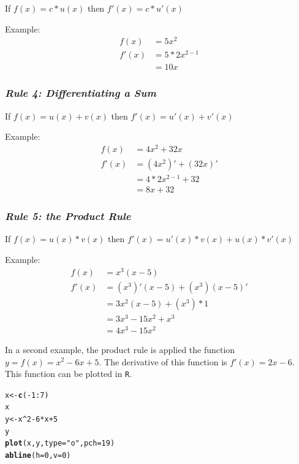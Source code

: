\documentclass[11pt,openany]{book}\usepackage[]{graphicx}\usepackage[]{color}
\makeatletter
\newcommand{\hlnum}[1]{\textcolor[rgb]{0.686,0.059,0.569}{#1}}%
\newcommand{\hlstr}[1]{\textcolor[rgb]{0.192,0.494,0.8}{#1}}%
\newcommand{\hlopt}[1]{\textcolor[rgb]{0,0,0}{#1}}%
\newcommand{\hlstd}[1]{\textcolor[rgb]{0.345,0.345,0.345}{#1}}%
\newcommand{\hlkwb}[1]{\textcolor[rgb]{0.69,0.353,0.396}{#1}}%
\newcommand{\hlkwc}[1]{\textcolor[rgb]{0.333,0.667,0.333}{#1}}%
\newcommand{\hlkwd}[1]{\textcolor[rgb]{0.737,0.353,0.396}{\textbf{#1}}}%
\newenvironment{kframe}{%
 \def\at@end@of@kframe{}%
 \ifinner\ifhmode%
  \def\at@end@of@kframe{\end{minipage}}%
  \begin{minipage}{\columnwidth}%
 \fi\fi%
 \def\FrameCommand##1{\hskip\@totalleftmargin \hskip-\fboxsep
 \colorbox{shadecolor}{##1}\hskip-\fboxsep
     \hskip-\linewidth \hskip-\@totalleftmargin \hskip\columnwidth}%
 \MakeFramed {\advance\hsize-\width
   \@totalleftmargin\z@ \linewidth\hsize
   \@setminipage}}%
 {\par\unskip\endMakeFramed%
 \at@end@of@kframe}
\newenvironment{knitrout}{}{} %
\renewenvironment{knitrout}{\begin{singlespace}}{\end{singlespace}}
\makeatother
\begin{document}
  \begin{center}
    If $f(x)=c*u(x)$ then $f'(x)=c*u'(x)$
  \end{center}
\noindent Example:
\begin{align*}
f(x) &= 5x^{2} \\ 
f'(x)&=5*2x^{2-1} \\
&=10x
\end{align*}

\subsubsection{\textit{Rule 4: Differentiating a Sum}}

  \begin{center}
    If $f(x)=u(x)+v(x)$ then $f'(x)=u'(x)+v'(x)$
  \end{center}
\noindent Example:  
\begin{align*}
f(x)&= 4x^{2}+32x \\
f'(x)&=(4x^{2})'+(32x)' \\
&=4*2x^{2-1}+32 \\
&=8x+32 
\end{align*}

\subsubsection{\textit{Rule 5: the Product Rule}}

  \begin{center}
    If $f(x)=u(x)*v(x)$ then $f'(x)=u'(x)*v(x)+u(x)*v'(x)$
  \end{center}
\noindent Example: 
\begin{align*}
f(x) &= x^{3}(x-5) \\ 
f'(x)&=(x^{3})'(x-5)+(x^{3})(x-5)' \\
&=3x^{2}(x-5)+(x^{3})*1 \\
&=3x^{3}-15x^{2}+x^{3}\\
&=4x^{3}-15x^{2} 
\end{align*}

In a second example, the product rule is applied the function $y=f(x)=x^{2}-6x+5$. The derivative of this function is $f'(x)=2x-6$. This function can be plotted in \texttt{R}.  

\begin{knitrout}
\color{fgcolor}\begin{kframe}
\begin{alltt}
\hlstd{x} \hlkwb{<-} \hlkwd{c}\hlstd{(}\hlopt{-}\hlnum{1}\hlopt{:}\hlnum{7}\hlstd{)}
\hlstd{x}
\hlstd{y} \hlkwb{<-} \hlstd{x}\hlopt{^}\hlnum{2} \hlopt{-} \hlnum{6} \hlopt{*} \hlstd{x} \hlopt{+} \hlnum{5}
\hlstd{y}
\hlkwd{plot}\hlstd{(x, y,} \hlkwc{type} \hlstd{=} \hlstr{"o"}\hlstd{,} \hlkwc{pch} \hlstd{=} \hlnum{19}\hlstd{)}
\hlkwd{abline}\hlstd{(}\hlkwc{h} \hlstd{=} \hlnum{0}\hlstd{,} \hlkwc{v} \hlstd{=} \hlnum{0}\hlstd{)}
\end{alltt}
\end{kframe}
\end{knitrout}
\end{document}
